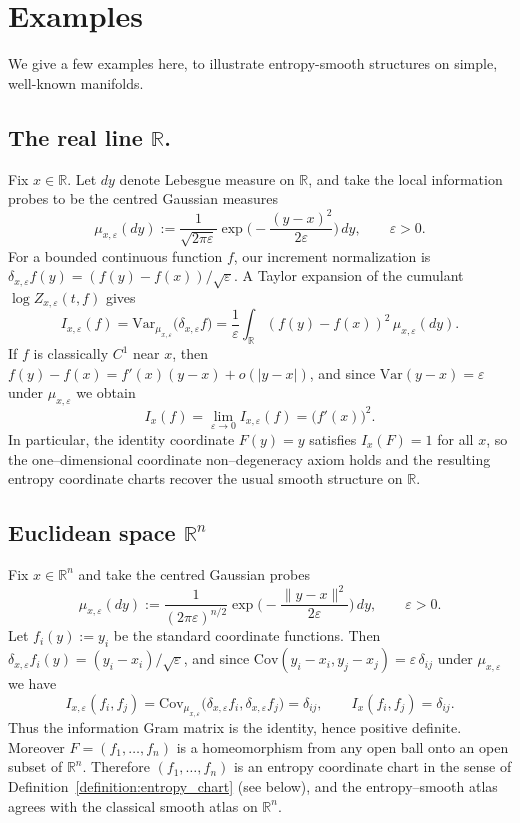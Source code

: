 \documentclass[11pt]{amsart}
\theoremstyle{definition}
\theoremstyle{remark}
\begin{document}
\section{Examples}
We give a few examples here, to illustrate entropy-smooth structures on simple, well-known manifolds.

\subsection{The real line \(\mathbb{R}\).}
Fix \(x\in\mathbb{R}\). Let \(dy\) denote Lebesgue measure on \(\mathbb{R}\), and take the local
information probes to be the centred Gaussian measures
\[
  \mu_{x,\varepsilon}(dy)
  :=
  \frac{1}{\sqrt{2\pi\varepsilon}}
  \exp\!\Big(-\frac{(y-x)^2}{2\varepsilon}\Big)\,dy,
  \qquad \varepsilon>0.
\]
For a bounded continuous function \(f\), our increment normalization is
\(\delta_{x,\varepsilon}f(y)=(f(y)-f(x))/\sqrt\varepsilon\).  A Taylor expansion of the cumulant
\(\log Z_{x,\varepsilon}(t,f)\) gives
\[
I_{x,\varepsilon}(f)=\mathrm{Var}_{\mu_{x,\varepsilon}}\bigl(\delta_{x,\varepsilon} f\bigr)
=\frac{1}{\varepsilon}\int_{\mathbb{R}}(f(y)-f(x))^2\,\mu_{x,\varepsilon}(dy).
\]
If \(f\) is classically \(C^1\) near \(x\), then
\(f(y)-f(x)=f'(x)(y-x)+o(|y-x|)\), and since \(\mathrm{Var}(y-x)=\varepsilon\) under
\(\mu_{x,\varepsilon}\) we obtain
\[
I_x(f)=\lim_{\varepsilon\to0} I_{x,\varepsilon}(f)=\bigl(f'(x)\bigr)^2.
\]
In particular, the identity coordinate \(F(y)=y\) satisfies \(I_x(F)=1\) for all \(x\), so the
one--dimensional coordinate non--degeneracy axiom holds and the resulting
entropy coordinate charts recover the usual smooth structure on \(\mathbb{R}\).

\subsection{Euclidean space $\mathbb{R}^n$}
\label{example:Rn}
Fix $x\in\mathbb{R}^n$ and take the centred Gaussian probes
\[
\mu_{x,\varepsilon}(dy) := \frac{1}{(2\pi\varepsilon)^{n/2}} \exp\!\Big(-\frac{\|y - x\|^2}{2\varepsilon}\Big)\, dy, \qquad \varepsilon > 0.
\]
Let $f_i(y):=y_i$ be the standard coordinate functions. Then
\(\delta_{x,\varepsilon} f_i(y)=(y_i-x_i)/\sqrt\varepsilon\), and since
\(\mathrm{Cov}(y_i-x_i,y_j-x_j)=\varepsilon\,\delta_{ij}\) under \(\mu_{x,\varepsilon}\) we have
\[
I_{x,\varepsilon}(f_i,f_j)=\mathrm{Cov}_{\mu_{x,\varepsilon}}\bigl(\delta_{x,\varepsilon}f_i,\delta_{x,\varepsilon}f_j\bigr)=\delta_{ij},
\qquad
I_x(f_i,f_j)=\delta_{ij}.
\]
Thus the information Gram matrix is the identity, hence positive definite.
Moreover $F=(f_1,\dots,f_n)$ is a homeomorphism from any open ball onto an open subset of
$\mathbb{R}^n$. Therefore $(f_1,\dots,f_n)$ is an entropy coordinate chart in the sense of
Definition~\ref{definition:entropy_chart} (see below), and the entropy--smooth atlas agrees with
the classical smooth atlas on $\mathbb{R}^n$.
\end{document}
